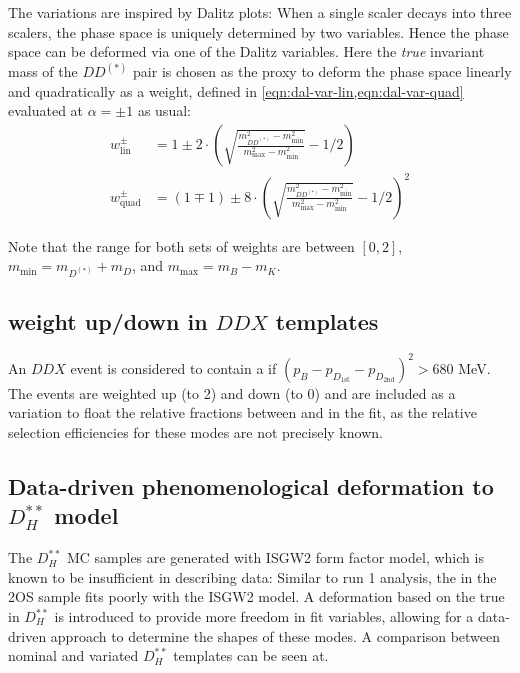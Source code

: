 The variations are inspired by Dalitz plots:
When a single scaler decays into three scalers,
the phase space is uniquely determined by two variables.
Hence the phase space can be deformed via one of the Dalitz variables.
Here the \emph{true} invariant mass of the $DD^{(*)}$ pair is chosen as the
proxy to deform the phase space linearly and quadratically
as a weight, defined in \cref{eqn:dal-var-lin,eqn:dal-var-quad} evaluated at
$\alpha = \pm 1$ as usual:
\begin{align}
    w_\text{lin}^\pm &= 1 \pm 2 \cdot
    \left(
    \sqrt{
        \frac{m_{DD^{(*)}}^2 - m_\text{min}^2}{m_\text{max}^2 - m_\text{min}^2}
    } - 1/2
    \right)
    \label{eqn:dal-var-lin} \\
    w_\text{quad}^\pm &= (1 \mp 1) \pm 8 \cdot
    \left(
    \sqrt{
        \frac{m_{DD^{(*)}}^2 - m_\text{min}^2}{m_\text{max}^2 - m_\text{min}^2}
    } - 1/2
    \right)^2
    \label{eqn:dal-var-quad}
\end{align}

Note that the range for both sets of weights are between $[0, 2]$,
$m_\text{min} = m_{D^{(*)}} + m_D$, and $m_\text{max} = m_B - m_K$.


\subsection{\Kstar weight up/down in $DDX$ templates}

An $DDX$ event is considered to contain a \Kstar if
$(p_B - p_{D_\text{1st}} - p_{D_\text{2nd}})^2 > 680$ MeV.
The \Kstar events are weighted up (to 2) and down (to 0) and are included as
a variation to float the relative fractions between \kaon and \Kstar in the fit,
as the relative selection efficiencies for these modes are not precisely known.


\subsection{Data-driven phenomenological deformation to $D_H^{**}$ model}

The $D_H^{**}$ MC samples are generated with ISGW2 form factor model, which
is known to be insufficient in describing data:
Similar to run 1 analysis, the \qSq in the 2OS sample fits poorly with the ISGW2
model.
A deformation based on the true \qSq
in $D_H^{**}$ is introduced to provide more freedom in fit variables,
allowing for a data-driven approach to determine the shapes of these modes.
A comparison between nominal and variated $D_H^{**}$ templates can be seen at.


